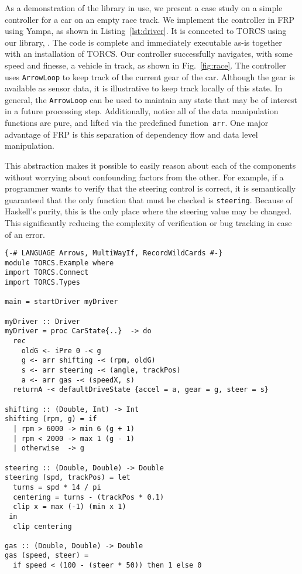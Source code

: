 As a demonstration of the \ourLib library in use, we present a case study on a simple controller for a car on an empty race track.
We implement the controller in FRP using Yampa, as shown in Listing~\ref{lst:driver}. 
It is connected to TORCS using our library, \ourLib.
The code is complete and immediately executable as-is together with an installation of TORCS.
Our controller successfully navigates, with some speed and finesse, a vehicle in track, as shown in Fig.~\ref{fig:race}.
The controller uses \texttt{ArrowLoop} to keep track of the current gear of the car.
Although the gear is available as sensor data, it is illustrative to keep track locally of this state.
In general, the \texttt{ArrowLoop} can be used to maintain any state that may be of interest in a future processing step.
Additionally, notice all of the data manipulation functions are pure, and lifted via the predefined function~\texttt{arr}.
One major advantage of FRP is this separation of dependency flow and data level manipulation. 

This abstraction makes it possible to easily reason about each of the components without worrying about confounding factors from the other.
For example, if a programmer wants to verify that the steering control is correct, it is semantically guaranteed that the only function that must be checked is \texttt{steering}.
Because of Haskell's purity, this is the only place where the steering value may be changed. This significantly reducing the complexity of verification or bug tracking in case of an error.

\begin{lstlisting}[float,floatplacement=TR,caption=A complete basic controller in Yampa, label=lst:driver]
{-# LANGUAGE Arrows, MultiWayIf, RecordWildCards #-}
module TORCS.Example where
import TORCS.Connect
import TORCS.Types

main = startDriver myDriver

myDriver :: Driver
myDriver = proc CarState{..}  -> do
  rec 
    oldG <- iPre 0 -< g
    g <- arr shifting -< (rpm, oldG)
    s <- arr steering -< (angle, trackPos)
    a <- arr gas -< (speedX, s)
  returnA -< defaultDriveState {accel = a, gear = g, steer = s}

shifting :: (Double, Int) -> Int
shifting (rpm, g) = if 
  | rpm > 6000 -> min 6 (g + 1)
  | rpm < 2000 -> max 1 (g - 1)
  | otherwise  -> g
 
steering :: (Double, Double) -> Double
steering (spd, trackPos) = let
  turns = spd * 14 / pi
  centering = turns - (trackPos * 0.1)
  clip x = max (-1) (min x 1)
 in
  clip centering

gas :: (Double, Double) -> Double
gas (speed, steer) = 
  if speed < (100 - (steer * 50)) then 1 else 0
\end{lstlisting}

